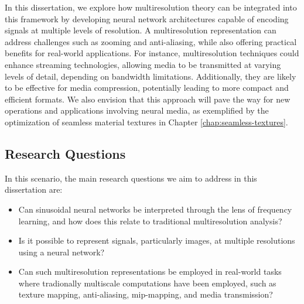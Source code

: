 In this dissertation, we explore how multiresolution theory can be integrated into this framework by developing neural network architectures capable of encoding signals at multiple levels of resolution. A multiresolution representation can address challenges such as zooming and anti-aliasing, while also offering practical benefits for real-world applications. For instance, multiresolution techniques could enhance streaming technologies, allowing media to be transmitted at varying levels of detail, depending on bandwidth limitations. Additionally, they are likely to be effective for media compression, potentially leading to more compact and efficient formats. We also envision that this approach will pave the way for new operations and applications involving neural media, as exemplified by the optimization of seamless material textures in Chapter \ref{chap:seamless-textures}. 




\subsection{Research Questions}

In this scenario, the main research questions we aim to address in this dissertation are:

\begin{itemize}
    \item Can sinusoidal neural networks be interpreted through the lens of frequency learning, and how does this relate to traditional multiresolution analysis? 
    \item Is it possible to represent signals, particularly images, at multiple resolutions using a neural network?
    \item Can such multiresolution representations be employed in real-world tasks where tradionally multiscale computations have been employed, such as texture mapping, anti-aliasing, mip-mapping, and media transmission?
\end{itemize}  
  
